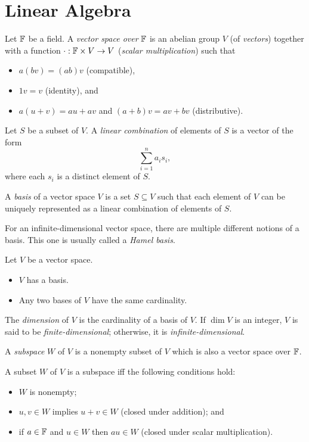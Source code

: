 \chapter{Linear Algebra}
\begin{defn}
  Let $\mathbb{F}$ be a field. A \emph{vector space over} $\mathbb{F}$ is an abelian group
  $V$ (of \emph{vectors})
  together with a function $\cdot:\mathbb{F}\times V\to V$ (\emph{scalar
    multiplication}) such that
  \begin{itemize}
    \item $a(b v)=(ab) v$ (compatible),
    \item $1 v= v$ (identity), and
    \item $a( u+ v)=a u+a v$ and $(a+b)
      v=a v+b v$ (distributive).
  \end{itemize}
\end{defn}
\begin{defn}
  Let $S$ be a subset of $V$. A \emph{linear combination} of elements of $S$ is
  a vector of the form \[\sum_{i=1}^n a_i s_i,\] where each $s_i$ is a
  distinct element of $S$.
\end{defn}
\begin{defn}
  A \emph{basis} of a vector space $V$ is a set $S\subseteq V$ such that each
  element of $V$ can be uniquely represented as a linear combination of elements
  of $S$.
\end{defn}
\begin{rem}
  For an infinite-dimensional vector space, there are multiple different notions
  of a basis. This one is usually called a \emph{Hamel basis}.
\end{rem}
\begin{thm}
  Let $V$ be a vector space.
  \begin{itemize}
    \item $V$ has a basis.
    \item Any two bases of $V$ have the same cardinality.
  \end{itemize}
\end{thm}
\begin{defn}
  The \emph{dimension} of $V$ is the cardinality of a basis of $V$. If $\dim V$
  is an integer, $V$ is said to be \emph{finite-dimensional}; otherwise, it is
  \emph{infinite-dimensional}.
\end{defn}
\begin{defn}
  A \emph{subspace} $W$ of $V$ is a nonempty subset of $V$ which is also a
  vector space over $\mathbb{F}$.
\end{defn}
\begin{prop}
  A subset $W$ of $V$ is a subspace iff the following conditions hold:
  \begin{itemize}
    \item $W$ is nonempty;
    \item $u,v\in W$ implies $u+v\in W$ (closed under addition); and
    \item if $a\in\mathbb{F}$ and $u\in W$ then $au\in W$ (closed under scalar
      multiplication).
  \end{itemize}
\end{prop}

